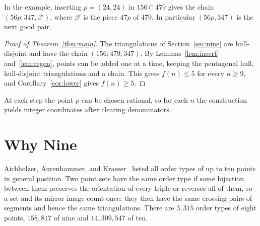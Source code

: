 \documentclass[11pt]{amsart}
\theoremstyle{definition}
\begin{document}
In the example, inserting $p=(24,24)$ in $156\cap479$ gives the chain $(56p;347,\beta')$, where $\beta'$ is the piece $47p$ of $479$. In particular $(56p,347)$ is the next good pair.

\begin{proof}[Proof of Theorem~\ref{thm:main}]
The triangulations of Section~\ref{sec:nine} are hull-disjoint and have the chain $(156;\allowbreak 479,\allowbreak 347)$. By Lemmas~\ref{lem:insert} and~\ref{lem:regen}, points can be added one at a time, keeping the pentagonal hull, hull-disjoint triangulations and a chain. This gives $f(n)\leq5$ for every $n\geq9$, and Corollary~\ref{cor:lower} gives $f(n)\geq5$.
\end{proof}

At each step the point $p$ can be chosen rational, so for each $n$ the construction yields integer coordinates after clearing denominators.

\section{Why Nine}\label{sec:small}

Aichholzer, Aurenhammer, and Krasser~\cite{AAK} listed all order types of up to ten points in general position. Two point sets have the same order type if some bijection between them preserves the orientation of every triple or reverses all of them, so a set and its mirror image count once; they then have the same crossing pairs of segments and hence the same triangulations. There are $3{,}315$ order types of eight points, $158{,}817$ of nine and $14{,}309{,}547$ of ten.
\end{document}
